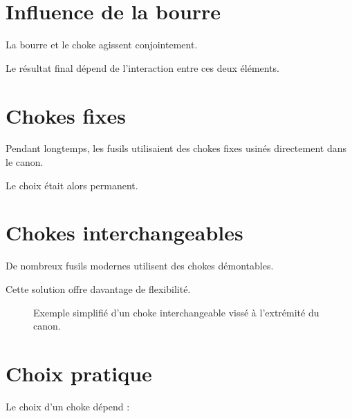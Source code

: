 \section{Influence de la bourre}

La bourre et le choke agissent conjointement.

Le résultat final dépend de l'interaction entre ces deux éléments.

\section{Chokes fixes}

Pendant longtemps, les fusils utilisaient des chokes fixes usinés directement
dans le canon.

Le choix était alors permanent.

\section{Chokes interchangeables}

De nombreux fusils modernes utilisent des chokes démontables.

Cette solution offre davantage de flexibilité.

\begin{figure}[htbp]
\centering


\caption{Exemple simplifié d'un choke interchangeable vissé à l'extrémité du canon.}
\label{fig:choke_interchangeable}

\end{figure}

\section{Choix pratique}

Le choix d'un choke dépend :

